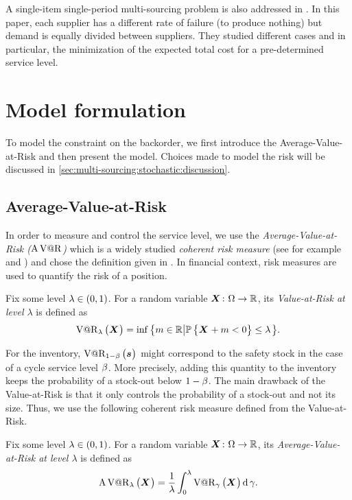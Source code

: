 A single-item single-period multi-sourcing problem is also addressed in \citet{Meena2011}.
In this paper, each supplier has a different rate of failure (\ie to produce nothing) but demand is equally divided between suppliers.
They studied different cases and in particular, the minimization of the expected total cost for a pre-determined service level.


\section{Model formulation}
\label{sec:multi-sourcing:stochastic:model-formulation}


To model the constraint on the backorder, we first introduce the Average-Value-at-Risk and then present the model.
Choices made to model the risk will be discussed in \cref{sec:multi-sourcing:stochastic:discussion}.


\subsection{Average-Value-at-Risk}


In order to measure and control the service level, we use the \emph{Average-Value-at-Risk ($\operatorname{A\operatorname{V@R}}$)} which is a widely studied \emph{coherent risk measure} (see for example \citet{Artzner1999} and \citet{Rockafellar2000,Rockafellar2002}) and chose the definition given in \citet{Follmer2004}.
In financial context, risk measures are used to quantify the risk of a position.


Fix some level $\lambda\in\bracket{0,1}$. For a random variable $\va X\colon\scenarios\to\RR$, its \emph{Value-at-Risk at level $\lambda$} is defined as
\begin{equation}
\VaR_{\lambda}\bracket{\va X} = \inf\crbracket{m\in\RR\left|\prob\crbracket{\va X+m<0}\le\lambda\right.}.
\end{equation}


For the inventory, $\VaR_{1-\servicelvl}\bracket{\va\inventory}$ might correspond to the safety stock in the case of a cycle service level $\beta$.
More precisely, adding this quantity to the inventory keeps the probability of a stock-out below $1-\beta$.
The main drawback of the Value-at-Risk is that it only controls the probability of a stock-out and not its size.
Thus, we use the following coherent risk measure defined from the Value-at-Risk.


Fix some level $\lambda\in\bracket{0,1}$. For a random variable $\va X\colon\scenarios\to\RR$, its \emph{Average-Value-at-Risk at level $\lambda$} is defined as
\begin{equation}
\AVaR_{\lambda}\bracket{\va X} = \frac{1}{\lambda}\int_0^{\lambda}\VaR_{\gamma}\bracket{\va X}\diff\gamma.
\end{equation}


